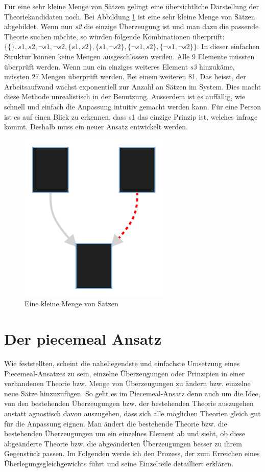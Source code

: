 \documentclass{article}
\begin{document}
Für eine sehr kleine Menge von Sätzen gelingt eine übersichtliche Darstellung der Theoriekandidaten noch. Bei Abbildung \ref{fig:smallset} ist eine sehr kleine Menge von Sätzen abgebildet. Wenn nun \textit{s2} die einzige Überzeugung ist und man dazu die passende Theorie suchen möchte, so würden folgende Kombinationen überprüft: $\{\{\}, s1, s2, \neg s1, \neg s2, \{s1,s2\}, \{s1,\neg s2\}, \{\neg s1, s2 \}, \{\neg s1, \neg s2 \} \}$. In dieser einfachen Struktur können keine Mengen ausgeschlossen werden. Alle 9 Elemente müssten überprüft werden. Wenn nun ein einziges weiteres Element \textit{s3} hinzukäme, müssten 27 Mengen überprüft werden. Bei einem weiteren 81. Das heisst, der Arbeitsaufwand wächst exponentiell zur Anzahl an Sätzen im System. Dies macht diese Methode unrealistisch in der Benutzung. Ausserdem ist es auffällig, wie schnell und einfach die Anpassung intuitiv gemacht werden kann. Für eine Person ist es auf einen Blick zu erkennen, dass s1 das einzige Prinzip ist, welches infrage kommt. Deshalb muss ein neuer Ansatz entwickelt werden.

\begin{figure}[ht]
  \centering
  \includegraphics{figure1}
  \caption{Eine kleine Menge von Sätzen\label{fig:smallset}}
\end{figure}

\section{Der piecemeal Ansatz} \label{piecemealansatz}
Wie \autocite[S.25]{beisbart_making_2015} feststellten, scheint die naheliegendste und einfachste Umsetzung eines Piecemeal-Ansatzes zu sein, einzelne Überzeugungen oder Prinzipien in einer vorhandenen Theorie bzw. Menge von Überzeugungen zu ändern bzw. einzelne neue Sätze hinzuzufügen. So geht es im Piecemeal-Ansatz denn auch um die Idee, von den bestehenden Überzeugungen bzw. der bestehenden Theorie auszugehen anstatt agnostisch davon auszugehen, dass sich alle möglichen Theorien gleich gut für die Anpassung eignen. Man ändert die bestehende Theorie bzw. die bestehenden Überzeugungen um ein einzelnes Element ab und sieht, ob diese abgeänderte Theorie bzw. die abgeänderten Überzeugungen besser zu ihrem Gegenstück passen. Im Folgenden werde ich den Prozess, der zum Erreichen eines Überlegungsgleichgewichts führt und seine Einzelteile detailliert erklären.
\end{document}
